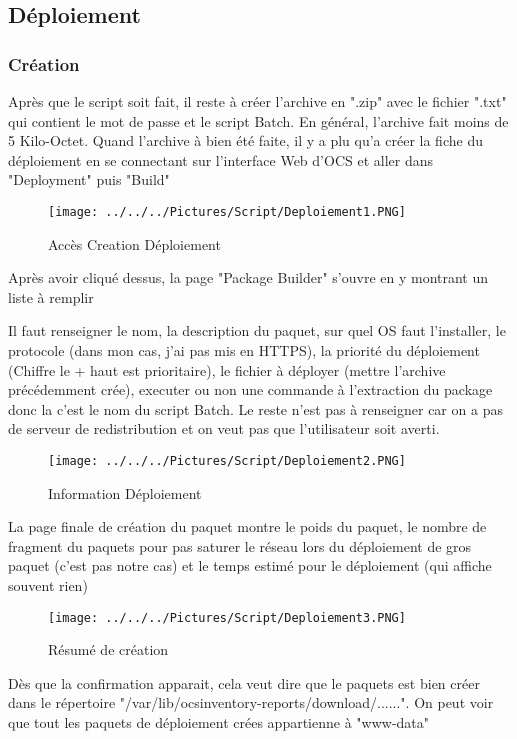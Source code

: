 \documentclass[11pt,a4paper,oneside]{article}
\begin{document}
\subsection{Déploiement}
\subsubsection{Création}
Après que le script soit fait, il reste à créer l'archive en ".zip" avec le fichier ".txt" qui contient le mot de passe et le script Batch. En général, l'archive fait moins de 5 Kilo-Octet. Quand l'archive à bien été faite, il y a plu qu'a créer la fiche du déploiement en se connectant sur l'interface Web d'OCS et aller dans "Deployment" puis "Build"
\\
\begin{figure}[hbtp]
\centering
\texttt{[image: ../../../Pictures/Script/Deploiement1.PNG]}
\caption{Accès Creation Déploiement}
\end{figure}

Après avoir cliqué dessus, la page "Package Builder" s'ouvre en y montrant un liste à remplir

Il faut renseigner le nom, la description du paquet, sur quel OS faut l'installer, le protocole (dans mon cas, j'ai pas mis en HTTPS), la priorité du déploiement (Chiffre le + haut est prioritaire), le fichier à déployer (mettre l'archive précédemment crée), executer ou non une commande à l'extraction du package donc la c'est le nom du script Batch. Le reste n'est pas à renseigner car on a pas de serveur de redistribution et on veut pas que l'utilisateur soit averti.
\begin{figure}[hbtp]
\centering
\texttt{[image: ../../../Pictures/Script/Deploiement2.PNG]}
\caption{Information Déploiement}
\end{figure}
\newpage

La page finale de création du paquet montre le poids du paquet, le nombre de fragment du paquets pour pas saturer le réseau lors du déploiement de gros paquet (c'est pas notre cas) et le temps estimé pour le déploiement (qui affiche souvent rien)

\begin{figure}[hbtp]
\centering
\texttt{[image: ../../../Pictures/Script/Deploiement3.PNG]}
\caption{Résumé de création}
\end{figure}

Dès que la confirmation apparait, cela veut dire que le paquets est bien créer dans le répertoire "/var/lib/ocsinventory-reports/download/......". On peut voir que tout les paquets de déploiement crées appartienne à "www-data"
\end{document}
